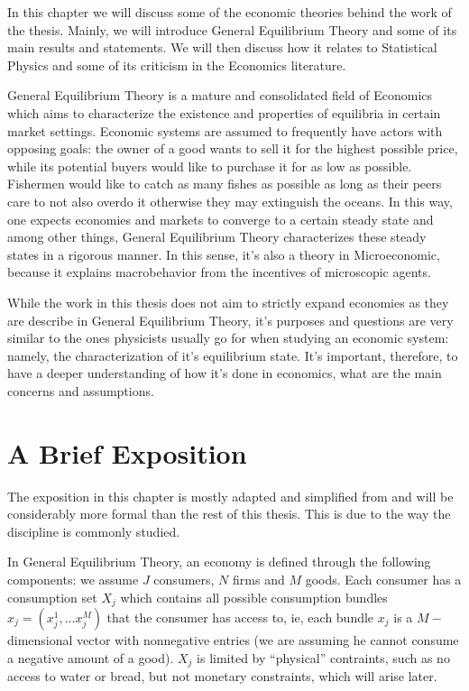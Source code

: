 In this chapter we will discuss some of the economic theories behind
the work of the thesis. Mainly, we will introduce General Equilibrium
Theory and some of its main results and statements. We will then
discuss how it relates to Statistical Physics and some of its
criticism in the Economics literature.

General Equilibrium Theory is a mature and consolidated field of
Economics \cite{Arrow54, mascolell, mckenzie} which aims to
characterize the existence and properties of equilibria in certain
market settings. Economic systems are assumed to frequently have
actors with opposing goals: the owner of a good wants to sell it for
the highest possible price, while its potential buyers would like to
purchase it for as low as possible. Fishermen would like to catch as
many fishes as possible as long as their peers care to not also overdo
it otherwise they may extinguish the oceans. In this way, one expects
economies and markets to converge to a certain steady state and among
other things, General Equilibrium Theory characterizes these steady
states in a rigorous manner. In this sense, it's also a theory in
Microeconomic, because it explains macrobehavior from the incentives
of microscopic agents.

While the work in this thesis does not aim to strictly expand
economies as they are describe in General Equilibrium Theory, it's
purposes and questions are very similar to the ones physicists usually
go for when studying an economic system: namely, the characterization
of it's equilibrium state. It's important, therefore, to have a
deeper understanding of how it's done in economics, what are the main
concerns and assumptions.

\section{A Brief Exposition}

The exposition in this chapter is mostly adapted and simplified from
\cite{mascolell} and will be considerably more formal than the rest of
this thesis. This is due to the way the discipline is commonly
studied.

In General Equilibrium Theory, an economy is defined through the
following components: we assume $J$ consumers, $N$ firms and $M$
goods. Each consumer has a consumption set $X_j$ which contains all
possible consumption bundles $x_j = (x_j^1, \ldots x_j^M)$ that the
consumer has access to, ie, each bundle $x_j$ is a $M-$dimensional
vector with nonnegative entries (we are assuming he cannot consume a
negative amount of a good). $X_j$ is limited by ``physical''
contraints, such as no access to water or bread, but not monetary
constraints, which will arise later.

